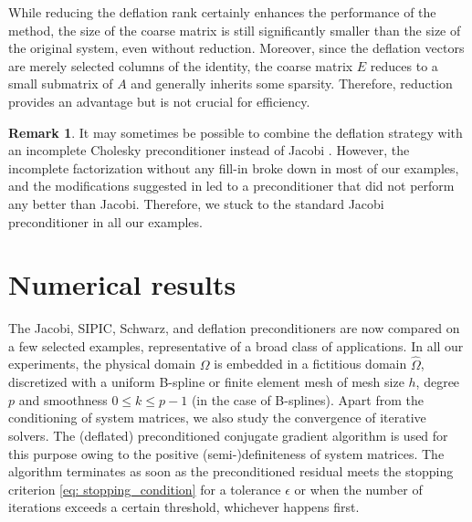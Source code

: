 \documentclass{article}
\numberwithin{equation}{section}
\theoremstyle{definition}
\newtheorem{remark}[definition]{Remark}
\begin{document}
While reducing the deflation rank certainly enhances the performance of the method, the size of the coarse matrix is still significantly smaller than the size of the original system, even without reduction. Moreover, since the deflation vectors are merely selected columns of the identity, the coarse matrix $E$ reduces to a small submatrix of $A$ and generally inherits some sparsity. Therefore, reduction provides an advantage but is not crucial for efficiency.

\begin{remark}
It may sometimes be possible to combine the deflation strategy with an incomplete Cholesky preconditioner instead of Jacobi \cite{vuik1999efficient}. However, the incomplete factorization without any fill-in broke down in most of our examples, and the modifications suggested in \cite{de2017condition} led to a preconditioner that did not perform any better than Jacobi. Therefore, we stuck to the standard Jacobi preconditioner in all our examples.     
\end{remark}

\section{Numerical results}
\label{se: numerical_results}
The Jacobi, SIPIC, Schwarz, and deflation preconditioners are now compared on a few selected examples, representative of a broad class of applications. In all our experiments, the physical domain $\Omega$ is embedded in a fictitious domain $\widehat{\Omega}$, discretized with a uniform B-spline or finite element mesh of mesh size $h$, degree $p$ and smoothness $0 \leq k \leq p-1$ (in the case of B-splines). Apart from the conditioning of system matrices, we also study the convergence of iterative solvers. The (deflated) preconditioned conjugate gradient algorithm is used for this purpose owing to the positive (semi-)definiteness of system matrices. The algorithm terminates as soon as the preconditioned residual meets the stopping criterion \eqref{eq: stopping_condition} for a tolerance $\epsilon$ or when the number of iterations exceeds a certain threshold, whichever happens first.
\end{document}
